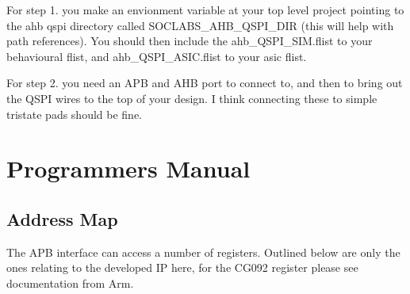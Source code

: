 \documentclass{report}
\begin{document}
For step 1. you make an envionment variable at your top level project pointing to the ahb qspi directory called 
SOCLABS\_AHB\_QSPI\_DIR (this will help with path references). You should then include the ahb\_QSPI\_SIM.flist to your 
behavioural flist, and ahb\_QSPI\_ASIC.flist to your asic flist. 

For step 2. you need an APB and AHB port to connect to, and then to bring out the QSPI wires to the top of your design. 
I think connecting these to simple tristate pads should be fine.

\chapter{Programmers Manual}

\section{Address Map}

The APB interface can access a number of registers. Outlined below are only the ones relating to the developed IP here,
for the CG092 register please see documentation from Arm.
\end{document}
